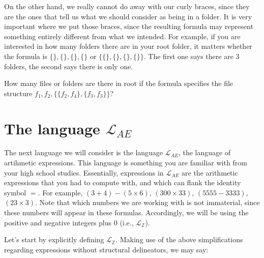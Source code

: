 On the other hand, we really cannot do away with our curly braces, since they are the ones that tell us what we should consider as being in a folder. It is very important where we put those braces, since the resulting formula may represent something entirely different from what we intended. For example, if you are interested in how many folders there are in your root folder, it matters whether the formula is $\{\}, \{\}, \{\}, \{\}$ or $\{\{\}, \{\}, \{\}, \{\}\}$. The first one says there are 3 folders, the second says there is only one. 

\begin{exc}
How many files or folders are there in \textsf{root} if the formula specifies the file structure $f_1, f_2, \{\{f_2, f_4\}, \{f_3,f_3\}\}$?
\end{exc}

\newpage

\section{The language $\mathcal{L}_{AE}$}

The next language we will consider is the language $\mathcal{L}_{AE}$, the language of artihmetic expressions. This language is something you are familiar with from your high school studies. Essentially, expressions in $\mathcal{L}_{AE}$ are the arithmetic expressions that you had to compute with, and which can flank the identity symbol $=$. For example, $(3+4)-(5 \times 6)$, $(300\times 33)$, $(5555-3333)$, $(23 \times 3)$. Note that which numbers we are working with is not immaterial, since these numbers will appear in these formulas. Accordingly, we will be using the positive and negative integers plus $0$ (i.e., $\mathcal{L}_\mathbb{Z}$).

Let's start by explicitly defining $\mathcal{L}_\mathbb{Z}$. Making use of the above simplifications regarding expressions without structural delineators, we may say:




